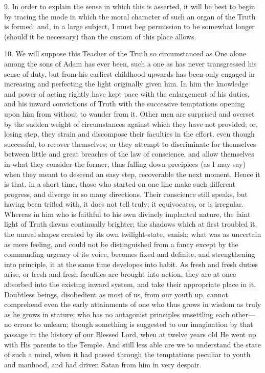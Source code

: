 9. In order to explain the sense in which this is asserted, it will
be best to begin by tracing the mode in which the moral character of
such an organ of the Truth is formed; and, in a large subject, I must
beg permission to be somewhat longer (should it be necessary) than the
custom of this place allows.

10. We will suppose this Teacher of the Truth so circumstanced as
One alone among the sons of Adam has ever been, such a one as has
never transgressed his sense of duty, but from his earliest childhood
upwards has been only engaged in increasing and perfecting the light
originally given him. In him the knowledge and power of acting rightly
have kept pace with the enlargement of his duties, and his inward
convictions of Truth with the successive temptations opening upon him
from without to wander from it. Other men are surprised and overset by
the sudden weight of circumstances against which they have not
provided; or, losing step, they strain and discompose their faculties
in the effort, even though successful, to recover themselves; or they
attempt to discriminate for themselves between little and great
breaches of the law of conscience, and allow themselves in what they
consider the former; thus falling down precipices (as I may say) when
they meant to descend an easy step, recoverable the next moment. Hence
it is that, in a short time, those who started on one line make such
different progress, and diverge in so many directions. Their
conscience still speaks, but having been trifled with, it does not
tell truly; it equivocates, or is irregular. Whereas in him who is
faithful to his own divinely implanted nature, the faint light of
Truth dawns continually brighter; the shadows which at first troubled
it, the unreal shapes created by its own twilight-state, vanish; what
was as uncertain as mere feeling, and could not be distinguished from
a fancy except by the commanding urgency of its voice, becomes fixed
and definite, and strengthening into principle, it at the same time
developes into habit. As fresh and fresh duties arise, or fresh and
fresh faculties are brought into action, they are at once absorbed
into the existing inward system, and take their appropriate place in
it. Doubtless beings, disobedient as most of us, from our youth up,
cannot comprehend even the early attainments of one who thus grows in
wisdom as truly as he grows in stature; who has no antagonist
principles unsettling each other—no errors to unlearn; though
something is suggested to our imagination by that passage in the
history of our Blessed Lord, when at twelve years old He went up with
His parents to the Temple. And still less able are we to understand
the state of such a mind, when it had passed through the temptations
peculiar to youth and manhood, and had driven Satan from him in very
despair.

